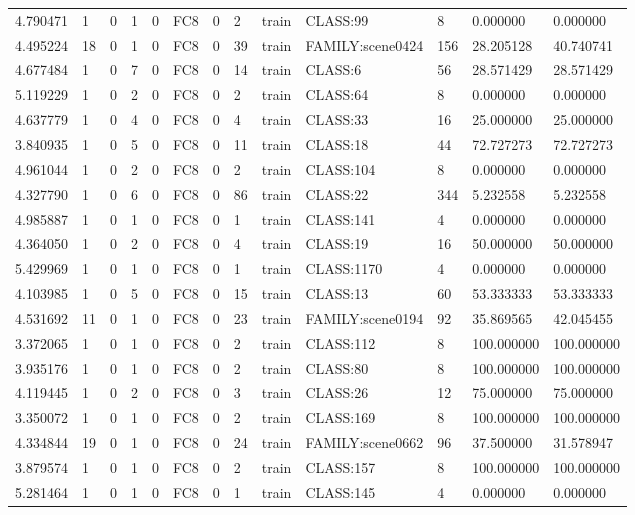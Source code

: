 \begin{tabular}{lllllllllllll}
4.790471 & 1 & 0 & 1 & 0 & FC8 & 0 & 2 & train & CLASS:99 & 8 & 0.000000 & 0.000000 \\
4.495224 & 18 & 0 & 1 & 0 & FC8 & 0 & 39 & train & FAMILY:scene0424 & 156 & 28.205128 & 40.740741 \\
4.677484 & 1 & 0 & 7 & 0 & FC8 & 0 & 14 & train & CLASS:6 & 56 & 28.571429 & 28.571429 \\
5.119229 & 1 & 0 & 2 & 0 & FC8 & 0 & 2 & train & CLASS:64 & 8 & 0.000000 & 0.000000 \\
4.637779 & 1 & 0 & 4 & 0 & FC8 & 0 & 4 & train & CLASS:33 & 16 & 25.000000 & 25.000000 \\
3.840935 & 1 & 0 & 5 & 0 & FC8 & 0 & 11 & train & CLASS:18 & 44 & 72.727273 & 72.727273 \\
4.961044 & 1 & 0 & 2 & 0 & FC8 & 0 & 2 & train & CLASS:104 & 8 & 0.000000 & 0.000000 \\
4.327790 & 1 & 0 & 6 & 0 & FC8 & 0 & 86 & train & CLASS:22 & 344 & 5.232558 & 5.232558 \\
4.985887 & 1 & 0 & 1 & 0 & FC8 & 0 & 1 & train & CLASS:141 & 4 & 0.000000 & 0.000000 \\
4.364050 & 1 & 0 & 2 & 0 & FC8 & 0 & 4 & train & CLASS:19 & 16 & 50.000000 & 50.000000 \\
5.429969 & 1 & 0 & 1 & 0 & FC8 & 0 & 1 & train & CLASS:1170 & 4 & 0.000000 & 0.000000 \\
4.103985 & 1 & 0 & 5 & 0 & FC8 & 0 & 15 & train & CLASS:13 & 60 & 53.333333 & 53.333333 \\
4.531692 & 11 & 0 & 1 & 0 & FC8 & 0 & 23 & train & FAMILY:scene0194 & 92 & 35.869565 & 42.045455 \\
3.372065 & 1 & 0 & 1 & 0 & FC8 & 0 & 2 & train & CLASS:112 & 8 & 100.000000 & 100.000000 \\
3.935176 & 1 & 0 & 1 & 0 & FC8 & 0 & 2 & train & CLASS:80 & 8 & 100.000000 & 100.000000 \\
4.119445 & 1 & 0 & 2 & 0 & FC8 & 0 & 3 & train & CLASS:26 & 12 & 75.000000 & 75.000000 \\
3.350072 & 1 & 0 & 1 & 0 & FC8 & 0 & 2 & train & CLASS:169 & 8 & 100.000000 & 100.000000 \\
4.334844 & 19 & 0 & 1 & 0 & FC8 & 0 & 24 & train & FAMILY:scene0662 & 96 & 37.500000 & 31.578947 \\
3.879574 & 1 & 0 & 1 & 0 & FC8 & 0 & 2 & train & CLASS:157 & 8 & 100.000000 & 100.000000 \\
5.281464 & 1 & 0 & 1 & 0 & FC8 & 0 & 1 & train & CLASS:145 & 4 & 0.000000 & 0.000000 \\

\end{tabular}

